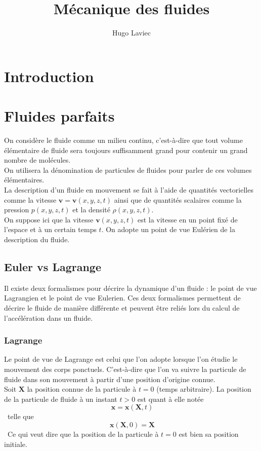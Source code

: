 \documentclass[10pt,a4paper]{book}
\author{Hugo Laviec}
\title{Mécanique des fluides}
\begin{document}
\maketitle

\tableofcontents

\chapter*{Introduction}

\chapter{Fluides parfaits}

On considère le fluide comme un milieu continu, c'est-à-dire que tout volume élémentaire de fluide sera toujours suffisamment grand pour contenir un grand nombre de molécules.\\
On utilisera la dénomination de particules de fluides pour parler de ces volumes élémentaires.\\

La description d'un fluide en mouvement se fait à l'aide de quantités vectorielles comme la vitesse $\mathbf{v}=\mathbf{v}(x,y,z,t)$ ainsi que de quantités scalaires comme la pression $p(x,y,z,t)$ et la densité $\rho(x,y,z,t)$.\\

On suppose ici que la vitesse $\mathbf{v}(x,y,z,t)$ est la vitesse en un point fixé de l'espace et à un certain temps $t$. On adopte un point de vue Eulérien de la description du fluide. 

\section{Euler vs Lagrange}

Il existe deux formalismes pour décrire la dynamique d'un fluide : le point de vue Lagrangien et le point de vue Eulerien. Ces deux formalismes permettent de décrire le fluide de manière différente et peuvent être reliés lors du calcul de l'accélération dans un fluide.


\subsection{Lagrange}

Le point de vue de Lagrange est celui que l'on adopte lorsque l'on étudie le mouvement des corps ponctuels. C'est-à-dire que l'on va suivre la particule de fluide dans son mouvement à partir d'une position d'origine connue.\\
Soit $\mathbf{X}$ la position connue de la particule à $t=0$ (temps arbitraire). La position de la particule de fluide à un instant $t>0$ est quant à elle notée \[\ \mathbf{x}=\mathbf{x}(\mathbf{X},t) \]\ telle que \[\ \mathbf{x}(\mathbf{X},0)=\mathbf{X} \]\ Ce qui veut dire que la position de la particule à $t=0$ est bien sa position initiale.
\end{document}

